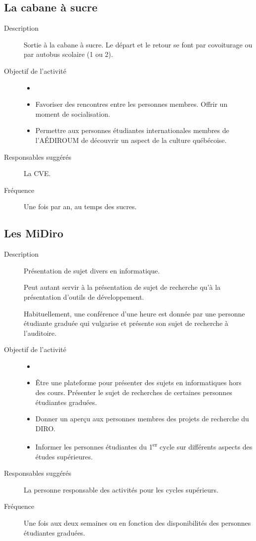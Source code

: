 \documentclass{aediroum}
\begin{document}
\subsection{La cabane à sucre}\label{sec:cabane-a-sucre}

\begin{description}
    \item[Description] Sortie à la cabane à sucre. Le départ et le retour se font par covoiturage ou par autobus scolaire (1 ou 2).
    \item[Objectif de l'activité]
    \begin{itemize}
        \item[]
        \item Favoriser des rencontres entre les personnes membres. Offrir un moment de socialisation.
        \item Permettre aux personnes étudiantes internationales membres de l'AÉDIROUM de découvrir un aspect de la culture québécoise.
    \end{itemize}
    \item[Responsables suggérés] La CVE.
    \item[Fréquence] Une fois par an, au temps des sucres.
\end{description}

\subsection{Les MiDiro}\label{sec:midiros}

\begin{description}
    \item[Description] Présentation de sujet divers en informatique.

	Peut autant servir à la présentation de sujet de recherche qu'à la présentation d'outils de développement.

	Habituellement, une conférence d'une heure est donnée par une personne étudiante graduée qui vulgarise et présente son sujet de recherche à l’auditoire.
    \item[Objectif de l'activité]
    \begin{itemize}
        \item[]
        \item Être une plateforme pour présenter des sujets en informatiques hors des cours. Présenter le sujet de recherches de certaines personnes étudiantes graduées.
        \item Donner un aperçu aux personnes membres des projets de recherche du DIRO.
        \item Informer les personnes étudiantes du 1\textsuperscript{er} cycle sur différents aspects des études supérieures.
    \end{itemize}
    \item[Responsables suggérés] La personne responsable des activités pour les cycles supérieurs.
    \item[Fréquence] Une fois aux deux semaines ou en fonction des disponibilités des personnes étudiantes graduées.
\end{description}
\end{document}
